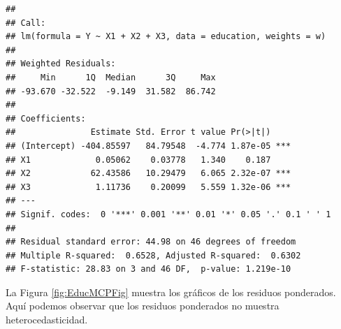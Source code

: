 \documentclass[
]{article}
\newenvironment{Shaded}{\begin{snugshade}}{\end{snugshade}}
\newcommand{\AttributeTok}[1]{\textcolor[rgb]{0.77,0.63,0.00}{#1}}
\newcommand{\DecValTok}[1]{\textcolor[rgb]{0.00,0.00,0.81}{#1}}
\newcommand{\FunctionTok}[1]{\textcolor[rgb]{0.00,0.00,0.00}{#1}}
\newcommand{\NormalTok}[1]{#1}
\newcommand{\OtherTok}[1]{\textcolor[rgb]{0.56,0.35,0.01}{#1}}
\newcommand{\SpecialCharTok}[1]{\textcolor[rgb]{0.00,0.00,0.00}{#1}}
\newcommand{\StringTok}[1]{\textcolor[rgb]{0.31,0.60,0.02}{#1}}
\begin{document}
\begin{verbatim}
## 
## Call:
## lm(formula = Y ~ X1 + X2 + X3, data = education, weights = w)
## 
## Weighted Residuals:
##     Min      1Q  Median      3Q     Max 
## -93.670 -32.522  -9.149  31.582  86.742 
## 
## Coefficients:
##               Estimate Std. Error t value Pr(>|t|)    
## (Intercept) -404.85597   84.79548  -4.774 1.87e-05 ***
## X1             0.05062    0.03778   1.340    0.187    
## X2            62.43586   10.29479   6.065 2.32e-07 ***
## X3             1.11736    0.20099   5.559 1.32e-06 ***
## ---
## Signif. codes:  0 '***' 0.001 '**' 0.01 '*' 0.05 '.' 0.1 ' ' 1
## 
## Residual standard error: 44.98 on 46 degrees of freedom
## Multiple R-squared:  0.6528, Adjusted R-squared:  0.6302 
## F-statistic: 28.83 on 3 and 46 DF,  p-value: 1.219e-10
\end{verbatim}

La Figura \ref{fig:EducMCPFig} muestra los gráficos de los residuos ponderados. Aquí podemos observar que los residuos ponderados no muestra heterocedasticidad.

\begin{Shaded}
\end{Shaded}
\end{document}
